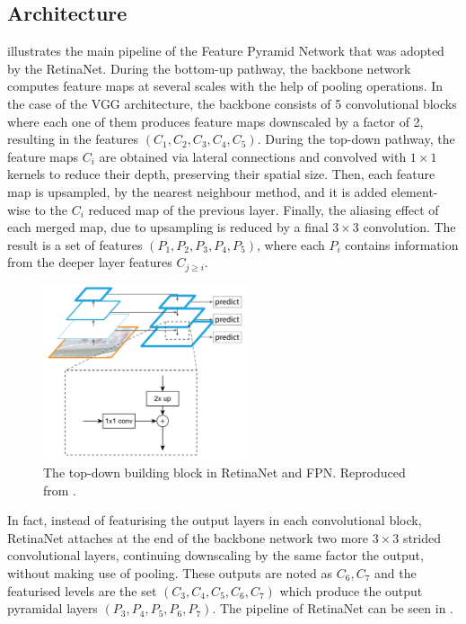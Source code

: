 \subsection{Architecture}
 illustrates the main pipeline of the Feature Pyramid Network that was adopted by the RetinaNet. During the bottom-up pathway, the backbone network computes feature maps at several scales with the help of pooling operations. In the case of the VGG architecture, the backbone consists of 5 convolutional blocks where each one of them produces feature maps downscaled by a factor of 2, resulting in the features $(C_1, C_2, C_3, C_4, C_5)$. During the top-down pathway, the feature maps $C_i$ are obtained via lateral connections and convolved with $1\times1$ kernels to reduce their depth, preserving their spatial size. Then, each feature map is upsampled, by the nearest neighbour method, and it is added element-wise to the $C_{i}$ reduced map of the previous layer. Finally, the aliasing effect of each merged map, due to upsampling is reduced by a final $3\times3$ convolution. The result is a set of features $(P_1,P_2,P_3,P_4,P_5)$, where each $P_i$ contains information from the deeper layer features $C_{j\geq i}$. 

\begin{figure}[!htb]
  \centering
  \includegraphics[width=6cm]{figures/ch3/fig5.png}
  \caption{The top-down building block in RetinaNet and FPN. Reproduced from \cite{lin2017feature}.}
  \label{ch3:fig5}
\end{figure} 

In fact, instead of featurising the output layers in each convolutional block, RetinaNet attaches at the end of the backbone network two more $3\times3$ strided convolutional layers, continuing downscaling by the same factor the output, without making use of pooling. These outputs are noted as $C_6,C_7$ and the featurised levels are the set $(C_3, C_4, C_5, C_6, C_7)$ which produce the output pyramidal layers $(P_3, P_4, P_5, P_6, P_7)$. The pipeline of RetinaNet can be seen in .

